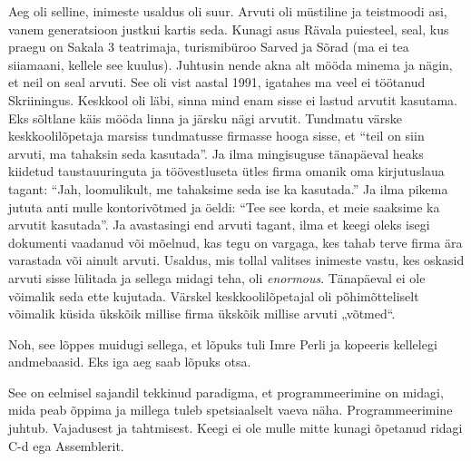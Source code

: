 
Aeg oli selline, inimeste usaldus oli suur. Arvuti oli müstiline ja teistmoodi 
asi, vanem 
generatsioon justkui kartis seda. Kunagi asus Rävala puiesteel, seal, kus 
praegu on Sakala 3 teatrimaja, turismibüroo Sarved ja Sõrad (ma ei tea siiamaani, kellele see kuulus). Juhtusin nende akna alt mööda 
minema ja nägin, et neil on 
seal arvuti. See oli vist aastal 1991, igatahes ma veel ei töötanud 
Skriiningus. Keskkool 
oli läbi, sinna mind enam sisse ei lastud arvutit kasutama. Eks sõltlane käis 
mööda linna ja järsku nägi arvutit. Tundmatu värske keskkoolilõpetaja 
marsiss tundmatusse firmasse hooga sisse, et 
\enquote{teil on siin arvuti, ma tahaksin seda kasutada}. Ja ilma mingisuguse 
tänapäeval heaks kiidetud taustauuringuta ja töövestluseta ütles firma omanik 
oma kirjutuslaua tagant: \enquote{Jah, loomulikult, me tahaksime seda ise ka 
kasutada.} Ja ilma 
pikema jututa anti mulle kontorivõtmed ja öeldi: \enquote{Tee 
see korda, et meie saaksime ka arvutit kasutada}. Ja avastasingi end
arvuti tagant, ilma et keegi oleks isegi dokumenti vaadanud või mõelnud, kas 
tegu on
vargaga, kes tahab terve firma ära varastada või 
ainult arvuti. Usaldus, mis tollal valitses inimeste vastu, kes 
oskasid arvuti sisse lülitada ja sellega midagi teha, oli 
\emph{enormous}.\label{sisu:andrus_usaldus} 
Tänapäeval ei ole võimalik seda ette kujutada. Värskel keskkoolilõpetajal oli 
põhimõtteliselt võimalik küsida ükskõik millise firma ükskõik millise  
arvuti „võtmed“. 

Noh, see lõppes muidugi sellega, et lõpuks tuli Imre Perli ja kopeeris kellelegi andmebaasid. Eks iga 
aeg saab lõpuks otsa. 


See on eelmisel sajandil tekkinud paradigma, et 
programmeerimine on midagi, mida peab õppima ja millega tuleb 
spetsiaalselt vaeva näha. Programmeerimine juhtub. Vajadusest ja tahtmisest. 
Keegi ei ole mulle mitte kunagi õpetanud 
ridagi C-d ega Assemblerit. 


